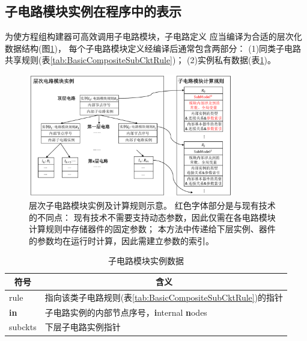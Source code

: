 \subsection{子电路模块实例在程序中的表示}
\label{subsec:subckt-instance-data-structure}
为使方程组构建器可高效调用子电路模块，子电路定义
应当编译为合适的层次化数据结构(图\ref{fig:subckt-instance-data-structure})，
每个子电路模块定义经编译后通常包含两部分：
(1)同类子电路共享规则(表\ref{tab:BasicCompositeSubCktRule})；
(2)实例私有数据(表\ref{tab:CompositeSubCkt})。
\begin{figure}[htpb]
  \centering
  \includegraphics[width=0.8\textwidth]{fig/subckt-instance-data-structure.pdf}
  \caption{层次子电路模块实例及计算规则示意。
  {\color{red}红色字体}部分是与现有技术\cite{tcherniaev2003transistor}的不同点：
  现有技术不需要支持动态参数，因此仅需在各电路模块计算规则中存储器件的固定参数；
  本方法中传递给下层实例、器件的参数均在运行时计算，因此需建立参数的索引。}
  \label{fig:subckt-instance-data-structure}
\end{figure}
\begin{table}[htbp]
  \centering
  \caption{子电路模块实例数据}\label{tab:CompositeSubCkt}
  \begin{tabular}{l|l}
    \hline
    \multicolumn{1}{c|}{符号} & \multicolumn{1}{c}{含义} \\
    \hline
    rule        & 指向该类子电路规则(表\ref{tab:BasicCompositeSubCktRule})的指针 \\
    \textbf{in} & 子电路实例的内部节点序号，\textbf{i}nternal \textbf{n}odes \\
    subckts     & 下层子电路实例指针 \\
    \hline
  \end{tabular}
\end{table}
